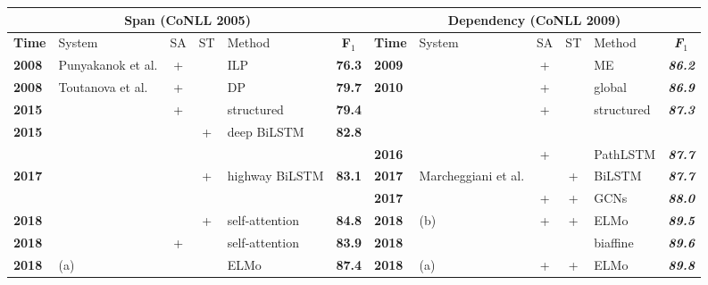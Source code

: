 \documentclass[letterpaper]{article} %
\begin{document}
\begin{table}[!htp]
	\renewcommand\arraystretch{1.3}
	\setlength{\tabcolsep}{5pt}
	\centering
	\small 
	\begin{tabular}{llcclc|llcclc}
		\hline
		
		\hline
		\multicolumn{6}{c|}{\textbf{Span (CoNLL 2005)}} & \multicolumn{6}{c}{\textbf{Dependency (CoNLL 2009)}} \\ 
		\hline
		\textbf{Time} & System  & SA & ST & Method & \textbf{F$_1$} & \textbf{Time} & System & SA & ST & Method & \textit{\textbf{F$_1$}} \\ 
		\hline
		\textbf{2008} & Punyakanok et al. & + & & ILP & \textbf{76.3} & \textbf{2009} & \citeauthor{Zhao2009Conll} & + &  & ME & \textit{\textbf{86.2}} \\ 
		\hline
		\textbf{2008} & Toutanova et al. & + &  & DP & \textbf{79.7} & \textbf{2010} & \citeauthor{bjorkelund2010} & + &  & global & \textit{\textbf{86.9}} \\ 
		\hline
		
		\hline
		\multicolumn{1}{l}{\textbf{2015}} & \multicolumn{1}{l}{\textbf{\citeauthor{Fitzgerald2015}}} &
		\multicolumn{1}{c}{+} & \multicolumn{1}{c}{} & \multicolumn{1}{l}{structured} & \multicolumn{1}{c}{\textbf{79.4}} & \multicolumn{2}{l}{} & \multicolumn{1}{c}{+} & \multicolumn{1}{c}{} & \multicolumn{1}{l}{structured} & \multicolumn{1}{c}{\textit{\textbf{87.3}}}\\
		\hline
		
		\hline
		\textbf{2015} & \citeauthor{zhou-xu2015} &  & +  & deep BiLSTM & \textbf{82.8} &  &  &  &  &  & \\
		\hline
		&  &  &  &  &  & \textbf{2016} & \citeauthor{roth2016} & +  &  & PathLSTM & \textit{\textbf{87.7}} \\ 
		\hline
		\textbf{2017} & \citeauthor{he-acl2017} &  & + & highway BiLSTM & \textbf{83.1} & \textbf{2017} & Marcheggiani et al. &  & +  & BiLSTM  & \textit{\textbf{87.7}} \\ 
		\hline
		&  &  &  &  &  & \textbf{2017} & \citeauthor{marcheggianiEMNLP2017} & +  & +  & GCNs  & \textit{\textbf{88.0}} \\
		\hline
		\textbf{2018} & \citeauthor{selfatt2018} &  & +  & self-attention & \textbf{84.8} & \textbf{2018} & \citeauthor{he:2018Syntax} (b) & + & +  & ELMo  & \textit{\textbf{89.5}} \\ 
		\hline
		\textbf{2018} & \citeauthor{Strubell2018}  & +  &  & self-attention & \textbf{83.9} & \textbf{2018} & \citeauthor{cai2018full} &  &  & biaffine  & \textit{\textbf{89.6}} \\ 
		\hline
		\textbf{2018} & \citeauthor{he2018jointly} (a) &  &  & ELMo  & \textbf{87.4} & \textbf{2018} & \citeauthor{li2018unified} (a) & + & + & ELMo & \textit{\textbf{89.8}} \\ 
		\hline
		

\end{tabular}
\end{table}
\end{document}
